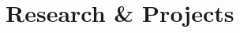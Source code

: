 \documentclass[letterpaper]{twentysecondcv} %
\begin{document}
\begin{twenty}
   
        
    
    
\end{twenty}

\section{Research \& Projects}
\end{document}
